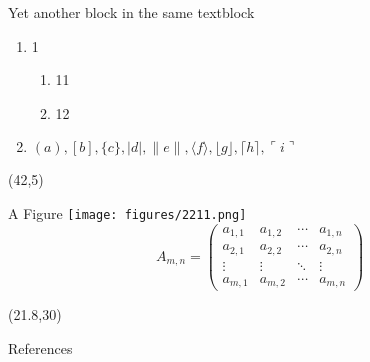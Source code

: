 \documentclass[14pt,final]{beamer}
\begin{document}
\begin{frame}{}
\begin{textblock}{19.3}
\begin{block}{Yet another block in the same textblock}
\begin{enumerate}
\item 1 \cite{latexcompanion}
\begin{enumerate}
\item 11
\item 12
\end{enumerate}
\item $( a ), [ b ], \{ c \}, | d |, \| e \|,
\langle f \rangle, \lfloor g \rfloor,
\lceil h \rceil, \ulcorner i \urcorner$
\end{enumerate}
\end{block}

\end{textblock}



\begin{textblock}{16.6}(42,5)
\begin{block}{A Figure}
\texttt{[image: figures/2211.png]}
\begin{equation}
A_{m,n} = 
 \begin{pmatrix}
  a_{1,1} & a_{1,2} & \cdots & a_{1,n} \\
  a_{2,1} & a_{2,2} & \cdots & a_{2,n} \\
  \vdots  & \vdots  & \ddots & \vdots  \\
  a_{m,1} & a_{m,2} & \cdots & a_{m,n} 
 \end{pmatrix}
\end{equation}

\end{block}
\end{textblock}



\begin{textblock}{30}(21.8,30)
\begin{block}{References}
\tiny


\end{block}
\end{textblock}


\end{frame}
\end{document}
